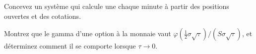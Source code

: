 \begin{interviewq}\label{iq:s2:zero-day-options-and-dealer-gamma-flows:5}
Concevez un système qui calcule une  chaque minute à partir des positions ouvertes et des cotations.
\end{interviewq}

\begin{interviewq}\label{iq:s2:zero-day-options-and-dealer-gamma-flows:6}
Montrez que le gamma d'une option à la monnaie vaut $\varphi(\tfrac12\sigma\sqrt\tau)/(S\sigma\sqrt\tau)$, et déterminez comment il se comporte lorsque $\tau \to 0$.
\end{interviewq}
